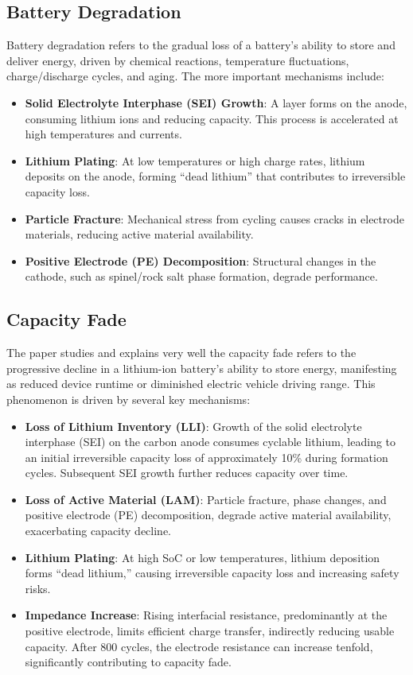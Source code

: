 \subsection{Battery Degradation}
Battery degradation refers to the gradual loss of a battery's ability to store and deliver
energy, driven by chemical reactions, temperature fluctuations, charge/discharge cycles,
and aging. The more important mechanisms include:

\begin{itemize}
    \item \textbf{Solid Electrolyte Interphase (SEI) Growth}: A layer forms on the anode, consuming lithium ions and reducing capacity. This process is accelerated at high temperatures and currents.
    \item \textbf{Lithium Plating}: At low temperatures or high charge rates, lithium deposits on the anode, forming ``dead lithium'' that contributes to irreversible capacity loss.
    \item \textbf{Particle Fracture}: Mechanical stress from cycling causes cracks in electrode materials, reducing active material availability.
    \item \textbf{Positive Electrode (PE) Decomposition}: Structural changes in the cathode, such as spinel/rock salt phase formation, degrade performance.
\end{itemize}

\subsection{Capacity Fade}
The \cite{zhang_studies_2000} paper studies and explains very well the capacity fade refers to the progressive decline in a lithium-ion battery’s ability to store energy, manifesting as reduced device runtime or diminished electric vehicle driving range. This phenomenon is driven by several key mechanisms:

\begin{itemize}
\item \textbf{Loss of Lithium Inventory (LLI)}: Growth of the solid electrolyte interphase (SEI) on the carbon anode consumes cyclable lithium, leading to an initial irreversible capacity loss of approximately 10\% during formation cycles. Subsequent SEI growth further reduces capacity over time.
\item \textbf{Loss of Active Material (LAM)}: Particle fracture, phase changes, and positive electrode (PE) decomposition, degrade active material availability, exacerbating capacity decline.
\item \textbf{Lithium Plating}: At high SoC or low temperatures, lithium deposition forms ``dead lithium,'' causing irreversible capacity loss and increasing safety risks.
\item \textbf{Impedance Increase}: Rising interfacial resistance, predominantly at the positive electrode, limits efficient charge transfer, indirectly reducing usable capacity. After 800 cycles, the electrode resistance can increase tenfold, significantly contributing to capacity fade.
\end{itemize}

